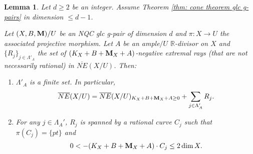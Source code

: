\documentclass[11pt]{amsart}
\numberwithin{equation}{section}
\newcommand{\Mm}{{\bf{M}}}
\newcommand{\Rr}{\mathbb{R}}
\newtheorem{lem}[thm]{Lemma}
\theoremstyle{definition}
\theoremstyle{definition}
\theoremstyle{definition}
\begin{document}
\begin{lem}\label{lem: low dimension gpair cone theorem imply finite extremal rays}
Let $d\geq 2$ be an integer. Assume Theorem \ref{thm: cone theorem glc g-pairs} in dimension $\leq d-1$.

Let $(X,B,\Mm)/U$ be an NQC glc g-pair of dimension $d$ and $\pi: X\rightarrow U$ the associated projective morphism. Let $A$ be an ample$/U$ $\Rr$-divisor on $X$ and $\{R_j\}_{j\in\Lambda'_A}$ the set of $(K_X+B+\Mm_X+A)$-negative extremal rays (that are not necessarily rational) in $\overline{NE}(X/U)$. Then:
\begin{enumerate}
    \item $\Lambda'_A$ is a finite set. In particular,
    $$\overline{NE}(X/U)=\overline{NE}(X/U)_{K_X+B+\Mm_X+A\geq 0}+\sum_{j\in\Lambda'_A}R_j.$$
    \item For any $j\in\Lambda_A'$, $R_j$ is spanned by a rational curve $C_j$ such that $\pi(C_j)=\{pt\}$ and
    $$0<-(K_X+B+\Mm_X+A)\cdot C_j\leq 2\dim X.$$
\end{enumerate}
\end{lem}
\end{document}
